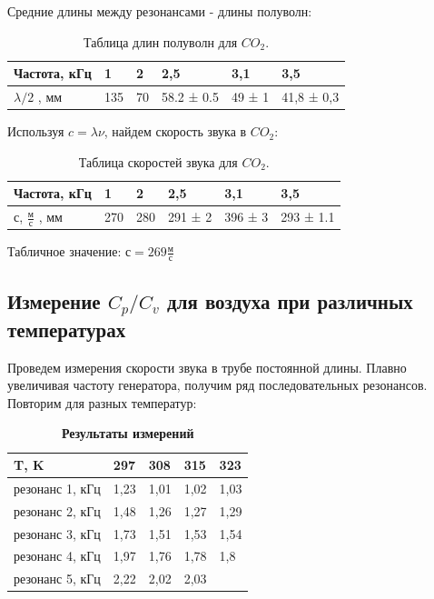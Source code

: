 \documentclass[11pt]{article}
\begin{document}
Средние длины между резонансами - длины полуволн:

\begin{table}[H]
    \centering
    \caption{Таблица длин полуволн для $CO_2$.}
    \begin{tabular}{|l|l|l|l|l|l|}
    \hline
        Частота, кГц & 1  & 2  & 2,5  & 3,1 & 3,5 \\ \hline
        $\lambda/2$ , мм & 135 & 70  & 58.2 ± 0.5  & 49 ± 1 & 41,8 ± 0,3\\ \hline
    \end{tabular}
\end{table}

Используя $c = \lambda \nu$, найдем скорость звука в $CO_2$:

\begin{table}[H]
    \centering
    \caption{Таблица скоростей звука для $CO_2$.}
    \begin{tabular}{|l|l|l|l|l|l|}
    \hline
        Частота, кГц & 1  & 2  & 2,5  & 3,1 & 3,5 \\ \hline
        с, $\frac{м}{с}$ , мм & 270  & 280  & 291 ± 2 & 396 ±  3& 293 ± 1.1\\ \hline
    \end{tabular}
\end{table}


    Табличное значение: $с = 269\frac{м}{с}$

\subsection{Измерение $ C_p/C_v $ для воздуха при различных температурах}

Проведем измерения скорости звука в трубе постоянной длины. Плавно увеличивая частоту генератора, получим ряд последовательных резонансов. Повторим для разных температур:

\begin{table}[!ht]
    \centering
    \caption{\textbf{Результаты измерений}}
    \begin{tabular}{|l|l|l|l|l|}
    \hline
        T, K  & 297 & 308 & 315 & 323 \\ \hline
        резонанс 1, кГц  & 1,23 & 1,01 & 1,02 & 1,03 \\ \hline
        резонанс 2, кГц & 1,48 & 1,26 & 1,27 & 1,29 \\ \hline
        резонанс 3, кГц & 1,73 & 1,51 & 1,53 & 1,54 \\ \hline
        резонанс 4, кГц & 1,97 & 1,76 & 1,78 & 1,8 \\ \hline
        резонанс 5, кГц & 2,22 & 2,02 & 2,03 & ~ \\ \hline
    \end{tabular}
\end{table}
\end{document}
